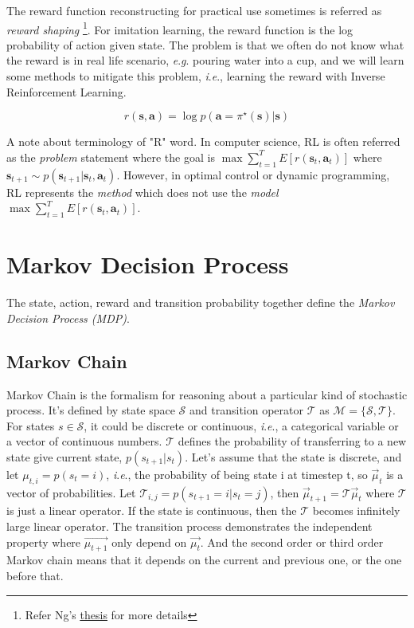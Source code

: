 \documentclass{tufte-handout}
\newcommand{\ie}{\textit{i}.\textit{e}., }
\newcommand{\eg}{\textit{e}.\textit{g}. }
\begin{document}
The reward function reconstructing for practical use sometimes is referred as \emph{reward shaping} \thanks{Refer Ng's \href{http://rll.berkeley.edu/deeprlcourse/docs/ng-thesis.pdf}{\underline{thesis}} for more details}. For imitation learning, the reward function is the log probability of action given state. The problem is that we often do not know what the reward is in real life scenario, \eg pouring water into a cup, and we will learn some methods to mitigate this problem, \ie learning the reward with Inverse Reinforcement Learning.

\[
r(\mathbf{s}, \mathbf{a}) = \log p(\mathbf{a} = \pi ^\star (\mathbf{s}) | \mathbf{s})
\]

A note about terminology of "R" word. In computer science, RL is often referred as the \emph{problem} statement where the goal is $\max \sum_{t=1}^T E[r(\mathbf{s}_t, \mathbf{a}_t)] $ where $\mathbf{s}_{t+1} \sim p(\mathbf{s}_{t+1} | \mathbf{s}_{t}, \mathbf{a}_{t}) $. However, in optimal control or dynamic programming, RL represents the \emph{method} which does not use the \emph{model} $\max \sum_{t=1}^T E[r(\mathbf{s}_t, \mathbf{a}_t)] $.


\section{Markov Decision Process}

The state, action, reward and transition probability together define the \emph{Markov Decision Process (MDP)}.

\subsection{Markov Chain}

Markov Chain is the formalism for reasoning about a particular kind of stochastic process. It's defined by state space $\mathcal{S}$ and transition operator $\mathcal{T}$ as $\mathcal{M} = \{\mathcal{S}, \mathcal{T} \}$. For states ${s} \in \mathcal{S}$, it could be discrete or continuous, \ie
a categorical variable or a vector of continuous numbers. $\mathcal{T}$ defines the probability of transferring to a new state give current state, $p({s}_{t+1} | {s}_{t})$. Let's assume that the state is discrete, and let $\mu_{t,i} = p(s_t = i) $, \ie the probability of being state i at timestep t, so
$\vec{\mu}_t $ is a vector of probabilities. Let $\mathcal{T}_{i,j} = p(s_{t+1} = i | s_t = j) $, then ${\vec{\mu}}_{t+1} = \mathcal{T} \vec{\mu}_{t}$ where
$\mathcal{T}$ is just a linear operator. If the state is continuous, then the $\mathcal{T}$ becomes infinitely large linear operator. The transition process demonstrates the independent property where $\vec{\mu_{t+1}} $ only depend on $\vec{\mu_t} $. And the second order or third order Markov chain means that it depends on the current and previous one, or the one before that.
\end{document}
